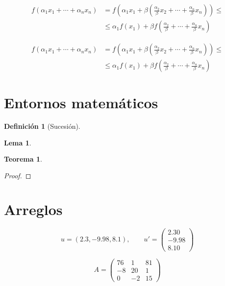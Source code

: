 \documentclass[a4paper, 11pt]{article}
\newtheorem{defi}{Definición}[section]
\newtheorem{lema}{Lema}[section]
\newtheorem{teo}{Teorema}[section]
\begin{document}
       \begin{align*}
           f\left(\alpha_{1}x_{1} + \cdots + \alpha_{n}x_{n}\right) &= f\left(\alpha_{1}x_{1} +\beta \left( \frac{\alpha_{2}}{\beta}x_{2} + \cdots + \frac{\alpha_{n}}{\beta}x_{n}\right)\right) \leq  \\
           & \leq \alpha_{1}f(x_{1}) + \beta f\left(\frac{\alpha_{2}}{\beta} + \cdots + \frac{\alpha_{n}}{\beta}x_{n}\right) 
       \end{align*}
       
       
        \begin{equation}
            \begin{aligned}
                f\left(\alpha_{1}x_{1} + \cdots + \alpha_{n}x_{n}\right) &= f\left(\alpha_{1}x_{1} +\beta \left( \frac{\alpha_{2}}{\beta}x_{2} + \cdots + \frac{\alpha_{n}}{\beta}x_{n}\right)\right) \leq  \\
                & \leq \alpha_{1}f(x_{1}) + \beta f\left(\frac{\alpha_{2}}{\beta} + \cdots + \frac{\alpha_{n}}{\beta}x_{n}\right)     
            \end{aligned}
        \end{equation}
    
     
     \section{Entornos matemáticos}
      
        \begin{defi}[Sucesión]
            \lipsum[9] 
        \end{defi}
        
        
        \begin{lema}
          \lipsum[8]
        \end{lema}
        
        
        \begin{teo}
            \lipsum[7]
        \end{teo}


        \begin{proof}
          \lipsum[6]
        \end{proof}
     
     \section{Arreglos}
      
      $$ u = (2.3, -9.98, 8.1),\qquad  u' = \left(\begin{array}{r}
                                         2.30\\
                                        -9.98\\
                                         8.10
                                     \end{array} \right)$$
      
       
       \begin{equation*}
          A = \left( \begin{array}{rrr}
                    76 & 1 & 81\\
                    -8 & 20 & 1 \\
                     0 & -2 & 15
              \end{array} \right)
       \end{equation*}
       
\end{document}
